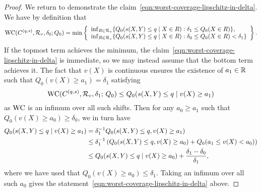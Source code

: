 \begin{proof}
  We return to demonstrate the
  claim~\eqref{eqn:worst-coverage-lipschitz-in-delta}.
  We have by definition that
  \begin{equation*}
    \textup{WC}(C^{(q,s)}, \mathcal{R}_v, \delta_0; Q_0)
    = \min\left\{
    \begin{array}{l}
      \inf_{R \in \mathcal{R}_v} \{Q_0(s(X, Y) \le q \mid X \in R) :
      \delta_1 \le Q_0(X \in R)\}, \\
      \inf_{R \in \mathcal{R}_v} \{Q_0(s(X, Y) \le q \mid X \in R) :
      \delta_0 \le Q_0(X \in R) < \delta_1 \}
    \end{array}
    \right\}.
  \end{equation*}
  If the topmost term achieves the minimum, the
  claim~\eqref{eqn:worst-coverage-lipschitz-in-delta} is immediate,
  so we may instead assume that the bottom term achieves it.  
 The fact that $v(X)$ is continuous ensures the
  existence of $a_1 \in \mathbb{R}$ such that $Q_0( v(X)  \ge a_1) = \delta_1$
  satisfying
  \begin{equation*}
    \textup{WC}( C^{(q,s)}, \mathcal{R}_{v}, \delta_1; \, Q_0)
    \le Q_0( s(X,Y) \le q \mid v(X) \ge a_1)
  \end{equation*}
  as $\textup{WC}$ is an infimum over all such shifts.
  Then for any $a_0 \ge a_1$ such that
  $Q_0( v(X) \ge a_0) \ge \delta_0$, we in turn have
  \begin{align*}
    Q_0( s(X,Y) \le q \mid v(X) \ge a_1)
    &= \delta_1^{-1} Q_0( s(X,Y) \le q,  v(X) \ge a_1) \\
    &\le \delta_1^{-1} \left( Q_0(s(X,Y) \le q,  v(X) \ge a_0) +  Q_0(a_1 \le  v(X) < a_0) \right) \\
    & \le Q_0( s(X,Y) \le q \mid v(X)  \ge a_0) + \frac{\delta_1 - \delta_0}{\delta_1},
  \end{align*}
  where we have used that $Q_0( v(X) \ge a_0) \le \delta_1$.
  Taking an infimum over all such $a_0$
  gives
  the statement~\eqref{eqn:worst-coverage-lipschitz-in-delta} above.
\end{proof}

